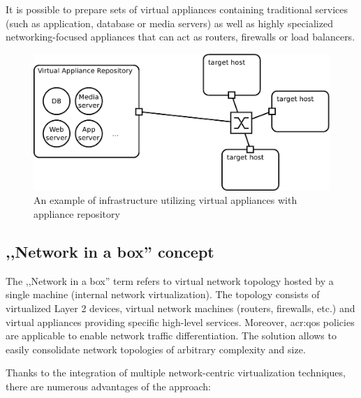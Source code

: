 \documentclass[11pt,openany]{book}
\begin{document}
        It is possible to prepare sets of virtual appliances containing traditional services (such as application,
        database or media servers) as well as highly specialized networking-focused appliances that can act as routers,
        firewalls or load balancers.
        
        \begin{figure}[H]
          \begin{center}
            \includegraphics[width=.7\textwidth]{img/solaris/virtual-appliance-infra.pdf}
          \end{center}

          \caption{An example of infrastructure utilizing virtual appliances with appliance repository}
        \end{figure}


      \subsection{,,Network in a box'' concept}

        The ,,Network in a box'' term refers to virtual network topology hosted by a single machine (internal network
        virtualization). The topology consists of virtualized Layer 2 devices, virtual network machines (routers,
        firewalls, etc.) and virtual appliances providing specific high-level services. Moreover, \gls{acr:qos} policies
        are applicable to enable network traffic differentiation. The solution allows to easily consolidate network
        topologies of arbitrary complexity and size.

        Thanks to the integration of multiple network-centric virtualization techniques, there are numerous advantages
        of the approach:
\end{document}
